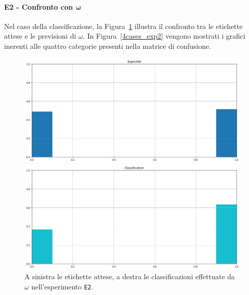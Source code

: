 \documentclass[12pt]{report}
\theoremstyle{definition}
\begin{document}
\paragraph{E2 - Confronto con $\bm{\omega}$}
Nel caso della classificazione, la Figura~\ref{classification_exp2} illustra il confronto tra le etichette attese e le previsioni di $\omega$. 
In Figura~\ref{4cases_exp2} vengono mostrati i grafici inerenti alle quattro categorie presenti nella matrice di confusione.
\begin{figure}
\centering
    \begin{minipage}{0.48\textwidth}
        \includegraphics[width=\linewidth]{images/experiment_beta5_disgiunti/expected_classification.png}
    \end{minipage}
    \begin{minipage}{0.48\textwidth}
        \includegraphics[width=\linewidth]{images/experiment_beta5_disgiunti/prediction_classification.png}
    \end{minipage}
    \caption{A sinistra le etichette attese, a destra le classificazioni effettuate da $\omega$ nell'esperimento \texttt{E2}.}
    \label{classification_exp2}
\end{figure}
\end{document}
